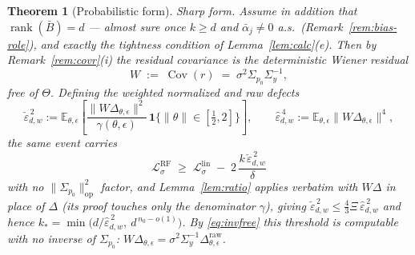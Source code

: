 \documentclass[11pt]{article}
\newtheorem{theorem}{Theorem}
\theoremstyle{remark}
\newcommand{\E}{\mathbb{E}}
\newcommand{\Cov}{\operatorname{Cov}}
\newcommand{\Sig}{\Sigma_{p_0}}
\newcommand{\Sy}{\Sigma_y}
\newcommand{\op}[1]{\lVert #1 \rVert_{\mathrm{op}}}
\begin{document}
\begin{theorem}[Probabilistic form]
\medskip
\noindent\emph{Sharp form.} Assume in addition that $\operatorname{rank}(\bar B) = d$ --- almost sure once $k \ge d$ and $\bar\alpha_j \ne 0$ a.s.\ (Remark~\ref{rem:bias-role}), and exactly the tightness condition of Lemma~\ref{lem:calc}(e). Then by Remark~\ref{rem:covr}(i) the residual covariance is the \emph{deterministic} Wiener residual
\[
W \;:=\; \Cov(r) \;=\; \sigma^2\Sig\Sy^{-1},
\]
free of $\Theta$. Defining the \emph{weighted} normalized and raw defects
\[
\check\varepsilon_{d,w}^{\,2} := \E_{\theta,\epsilon}\!\left[\frac{\lVert W\Delta_{\theta,\epsilon}\rVert^2}{\gamma(\theta,\epsilon)}\,\mathbf 1\big\{\lVert\theta\rVert\in[\tfrac12,2]\big\}\right],
\qquad
\hat\varepsilon_{d,w}^{\,4} := \E_{\theta,\epsilon}\big\lVert W\Delta_{\theta,\epsilon}\big\rVert^{4},
\]
the same event carries
\[
\boxed{\ \ \mathcal L^{\mathrm{RF}}_\sigma \;\ge\; \mathcal L^{\mathrm{lin}}_\sigma \;-\; 2\,\frac{k\,\check\varepsilon_{d,w}^{\,2}}{\delta}\ \ }
\]
with \emph{no} $\op{\Sig}^2$ factor, and Lemma~\ref{lem:ratio} applies verbatim with $W\Delta$ in place of $\Delta$ (its proof touches only the denominator $\gamma$), giving $\check\varepsilon_{d,w}^{\,2} \le \tfrac43\Xi\,\hat\varepsilon_{d,w}^{\,2}$ and hence $k_* = \min\big(d/\hat\varepsilon_{d,w}^{\,2},\ d^{\,n_0-o(1)}\big)$. By \eqref{eq:invfree} this threshold is computable with no inverse of $\Sig$: $W\Delta_{\theta,\epsilon} = \sigma^2\Sy^{-1}\Delta^{\mathrm{raw}}_{\theta,\epsilon}$.

\end{theorem}
\end{document}
